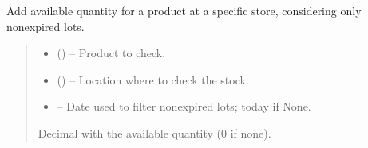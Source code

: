 \documentclass[a4paper,11pt,spanish]{sphinxmanual}
\begin{document}
\begin{fulllineitems}
\label{\detokenize{api/sale/sale.services:sale.services.available_stock_nonexpired}}
\pysigstartsignatures
\pysiglinewithargsret
{}
{\sphinxparamcomma {}\sphinxparamcomma {}}
{}
\pysigstopsignatures
\sphinxAtStartPar
Add available quantity for a product at a specific store,
considering only non\sphinxhyphen{}expired lots.
\begin{quote}\begin{description}
\begin{itemize}
\item {} 
\sphinxAtStartPar
{} () – Product to check.

\item {} 
\sphinxAtStartPar
{} ({\hyperref[\detokenize{api/inventory/inventory.models:inventory.models.Location}]{}}) – Location where to check the stock.

\item {} 
\sphinxAtStartPar
{} – Date used to filter non\sphinxhyphen{}expired lots; today if None.

\end{itemize}

\sphinxAtStartPar
Decimal with the available quantity (0 if none).

\sphinxAtStartPar
{}

\end{description}\end{quote}

\end{fulllineitems}

\end{document}

